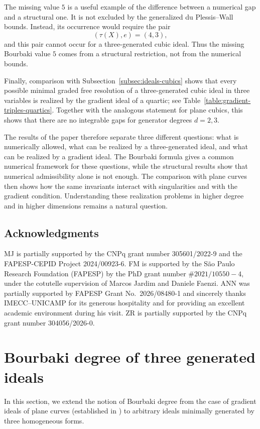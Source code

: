 \documentclass[11pt]{amsart} %
\theoremstyle{definition}
\begin{document}
The missing value $5$ is a useful example of the difference between a
numerical gap and a structural one. It is not excluded by the
generalized du Plessis--Wall bounds. Instead, its occurrence would
require the pair
\[
(\tau(X),e)=(4,3),
\]
and this pair cannot occur for a three-generated cubic ideal.
Thus the missing Bourbaki value $5$ comes from a structural restriction,
not from the numerical bounds.

Finally, comparison with
Subsection~\ref{subsec:ideals-cubics} shows that every possible minimal
graded free resolution of a three-generated cubic ideal in three
variables is realized by the gradient ideal of a quartic; see
Table~\ref{table:gradient-triples-quartics}. Together with the analogous
statement for plane cubics, this shows that there are no integrable gaps
for generator degrees $d=2,3$.

The results of the paper therefore separate three different questions:
what is numerically allowed, what can be realized by a three-generated
ideal, and what can be realized by a gradient ideal. The Bourbaki
formula gives a common numerical framework for these questions, while
the structural results show that numerical admissibility alone is not
enough. The comparison with plane curves then shows how the same
invariants interact with singularities and with the gradient condition.
Understanding these realization problems in higher degree and in higher dimensions remains a
natural question.
\subsection*{Acknowledgments}
MJ is partially supported by the CNPq grant number 305601/2022-9 and the FAPESP-CEPID Project 2024/00923-6.
FM is supported by the São Paulo Research Foundation (FAPESP) by the PhD grant number $\#2021/10550-4$, under the cotutelle supervision of Marcos Jardim and Daniele Faenzi.
ANN was partially supported by FAPESP Grant No.~2026/08480-1  and sincerely thanks IMECC–UNICAMP for its generous hospitality and for providing an excellent academic environment during his visit. ZR is partially supported by the CNPq grant number 304056/2026-0. 

\section{Bourbaki degree of three generated ideals}\label{sec:3-gen-general}
In this section, we extend the notion of Bourbaki degree from the case of gradient ideals of plane curves (established in \cite{MAA}) to arbitrary ideals minimally generated by three homogeneous forms.
\end{document}
